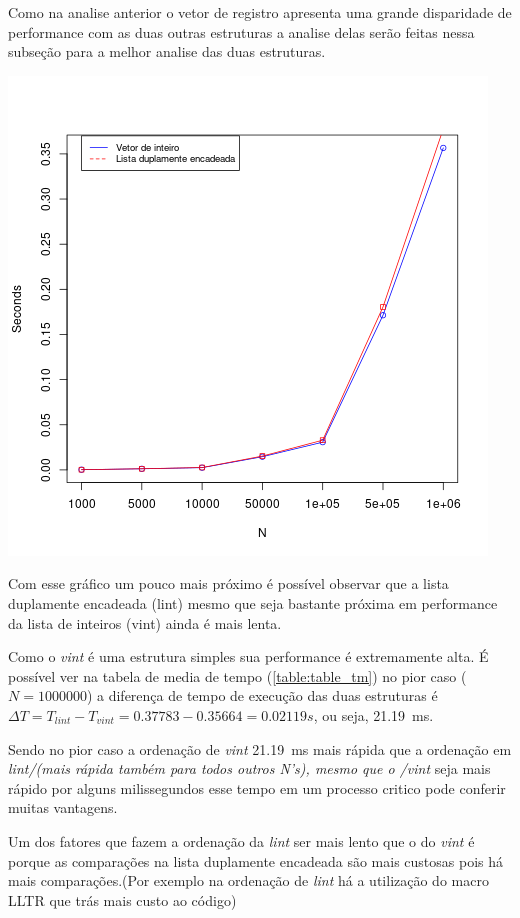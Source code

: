\documentclass[11pt]{article}
\begin{document}
Como na analise anterior o vetor de registro apresenta uma grande disparidade de performance com as duas outras estruturas a analise delas serão feitas nessa subseção para a melhor analise das duas estruturas.

\begin{center}
\includegraphics[width=.9\linewidth]{lint_vint_t.png}
\end{center}

Com esse gráfico um pouco mais próximo é possível observar que a lista duplamente encadeada (lint) mesmo que seja bastante próxima em performance da lista de inteiros (vint) ainda é mais lenta.

Como o \emph{vint} é uma estrutura simples sua performance é extremamente alta. É possível ver na tabela de media de tempo (\ref{table:table_tm}) no pior caso (\(N=1000000\)) a diferença de tempo de execução das duas estruturas é \(\Delta T = T_{lint}-T_{vint}=0.37783-0.35664= 0.02119s\), ou seja, 21.19\SI{}{\milli\second}. 

Sendo no pior caso a ordenação de \emph{vint} 21.19\SI{}{\milli\second} mais rápida que a ordenação em \emph{lint/(mais rápida também para todos outros N's), mesmo que o /vint} seja mais rápido por alguns milissegundos esse tempo em um processo critico pode conferir muitas vantagens.

Um dos fatores que fazem a ordenação da \emph{lint} ser mais lento que o do \emph{vint} é porque as comparações na lista duplamente encadeada são mais custosas pois há mais comparações.(Por exemplo na ordenação de \emph{lint} há a utilização do macro LLTR que trás mais custo ao código)
\end{document}
